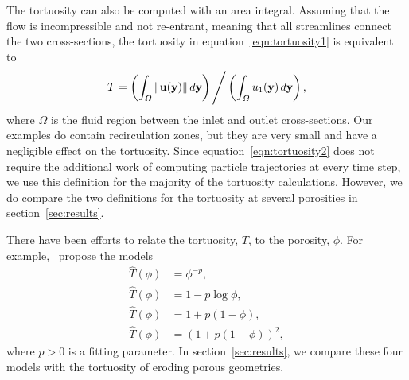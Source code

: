 \documentclass{jfm}
\begin{document}
The tortuosity can also be computed with an area integral. Assuming that
the flow is incompressible and not re-entrant, meaning that all
streamlines connect the two cross-sections, the tortuosity in
equation~\eqref{eqn:tortuosity1} is equivalent
to~\citep{dud-koz-mat2011}
\begin{align}
  T = \left(\int_\varOmega \|{\mathbf{u}}({\mathbf{y}})\|\, d{\mathbf{y}} \right)
    \Bigg/
      \left(\int_\varOmega u_1({\mathbf{y}})\, d{\mathbf{y}} \right),
  \label{eqn:tortuosity2}
\end{align}
where $\Omega$ is the fluid region between the inlet and outlet
cross-sections.  Our examples do contain recirculation zones, but they
are very small and have a negligible effect on the tortuosity.  Since
equation~\eqref{eqn:tortuosity2} does not require the additional work of
computing particle trajectories at every time step, we use this
definition for the majority of the tortuosity calculations.  However, we
do compare the two definitions for the tortuosity at several porosities
in section~\ref{sec:results}.

There have been efforts to relate the tortuosity, $T$, to the porosity,
$\phi$.  For example,~\citet{mat-kha-koz2008} propose the models
\begin{subequations}
  \label{eqn:tortuosityModels}
  \begin{align}
    \label{eqn:tortuosityModels1}
    \widehat{T}(\phi) &= \phi^{-p}, \\
    \label{eqn:tortuosityModels2}
    \widehat{T}(\phi) &= 1-p \log \phi, \\
    \label{eqn:tortuosityModels3}
    \widehat{T}(\phi) &= 1+p (1-\phi), \\
    \label{eqn:tortuosityModels4}
    \widehat{T}(\phi) &= (1+p (1-\phi))^2, 
  \end{align}
\end{subequations}
where $p>0$ is a fitting parameter.  In section~\ref{sec:results}, we
compare these four models with the tortuosity of eroding porous
geometries.

\end{document}
